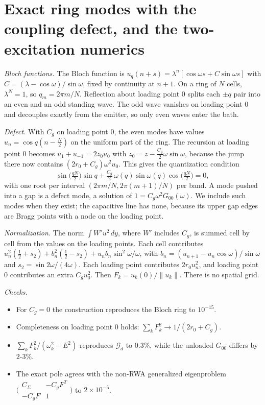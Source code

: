 \documentclass[aps,prresearch,twocolumn,superscriptaddress,nofootinbib,longbibliography,floatfix]{revtex4-2}
\newcommand{\G}{\mathcal{G}}
\begin{document}
\section{Exact ring modes with the coupling defect, and the two-excitation numerics}\label{app:ring}

\emph{Bloch functions.} The Bloch function is $u_q(n+s)=\lambda^n[\cos\omega s+C\sin\omega s]$ with
$C=(\lambda-\cos\omega)/\sin\omega$, fixed by continuity at $n+1$. On a ring of $N$ cells, $\lambda^N=1$, so
$q_m=2\pi m/N$. Reflection about loading point $0$ splits each $\pm q$ pair into an even and an odd standing wave. The odd
wave vanishes on loading point $0$ and decouples exactly from the emitter, so only even waves enter the bath.

\emph{Defect.} With $C_g$ on loading point 0, the even modes have values $u_n=\cos q(n-\tfrac N2)$ on the uniform part
of the ring. The recursion at loading point 0 becomes $u_1+u_{-1}=2z_0u_0$ with $z_0=z-\tfrac{C_g}{2}\omega\sin\omega$,
because the jump there now contains $(2r_0+C_g)\omega^2u_0$. This gives the quantization condition
\begin{equation}
\sin\!\big(\tfrac{qN}{2}\big)\sin q+\tfrac{C_g}{2}\,\omega(q)\sin\omega(q)\cos\!\big(\tfrac{qN}{2}\big)=0 ,
\end{equation}
with one root per interval $(2\pi m/N,2\pi(m+1)/N)$ per band. A mode pushed into a gap is a defect mode, a solution of
$1=C_g\omega^2G_{00}(\omega)$. We include such modes when they exist; the capacitive line has none, because its upper
gap edges are Bragg points with a node on the loading point.

\emph{Normalization.} The norm $\int W'u^2\,dy$, where $W'$ includes $C_g$, is summed cell by cell from the values on the
loading points. Each cell contributes $u_n^2(\tfrac12+s_2)+b_n^2(\tfrac12-s_2)+u_nb_n\sin^2\omega/\omega$, with
$b_n=(u_{n+1}-u_n\cos\omega)/\sin\omega$ and $s_2=\sin2\omega/(4\omega)$. Each loading point contributes $2r_0u_n^2$, and
loading point 0 contributes an extra $C_gu_0^2$. Then $F_k=u_k(0)/\|u_k\|$. There is no spatial grid.

\emph{Checks.}
\begin{itemize}
\item For $C_g=0$ the construction reproduces the Bloch ring to $10^{-15}$.
\item Completeness on loading point 0 holds: $\sum_kF_k^2\to1/(2r_0+C_g)$.
\item $\sum_kF_k^2/(\omega_k^2-E^2)$ reproduces $\G_d$ to $0.3\%$, while the unloaded $G_{00}$ differs by $2$-$3\%$.
\item The exact pole agrees with the non-RWA generalized eigenproblem
$\big(\begin{smallmatrix}C_\Sigma&-C_gF^{T}\\-C_gF&1\end{smallmatrix}\big)$ to $2\times10^{-5}$.
\end{itemize}
\end{document}
